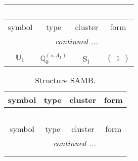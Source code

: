 \documentclass[fleqn,10pt,landscape]{article}
\begin{document}
\begin{itemize}
\begin{center}
\begin{longtable}{c|c|c|c}
\multicolumn{3}{l}{\tablename\ \thetable{}} \\
 \hline \hline
symbol & type & cluster & form \\ \hline \endhead

 \hline \hline
\multicolumn{3}{r}{\footnotesize\it continued ...} \\ \endfoot

 \hline \hline
\multicolumn{3}{r}{} \\ \endlastfoot

$ \mathbb{U}_{1} $ & $\mathbb{Q}_{0}^{(s,A_{1})}$ & S$_{1}$ & $\begin{pmatrix} 1 \end{pmatrix}$ \\
\end{longtable}
\end{center}
\begin{center}
\renewcommand{\arraystretch}{1.3}
\begin{longtable}{c|c|c|c}
\caption{Structure SAMB.}
 \\
 \hline \hline
symbol & type & cluster & form \\ \hline \endfirsthead

\multicolumn{3}{l}{\tablename\ \thetable{}} \\
 \hline \hline
symbol & type & cluster & form \\ \hline \endhead

 \hline \hline
\multicolumn{3}{r}{\footnotesize\it continued ...} \\ \endfoot

 \hline \hline
\multicolumn{3}{r}{} \\ \endlastfoot


\end{longtable}
\end{center}
\end{itemize}
\end{document}
